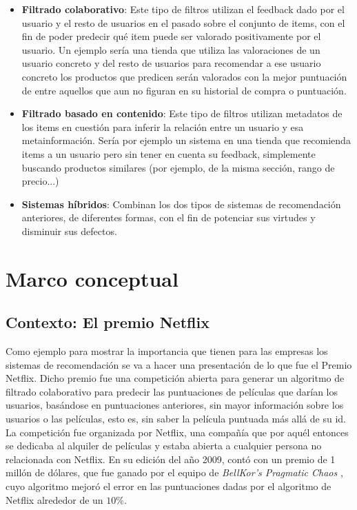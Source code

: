 \begin{itemize}
    \item \textbf{Filtrado colaborativo}: Este tipo de filtros utilizan el feedback dado por el usuario y el resto de usuarios en el pasado sobre el conjunto de items, con el fin de poder predecir qué item puede ser valorado positivamente por el usuario. Un ejemplo sería una tienda que utiliza las valoraciones de un usuario concreto y del resto de usuarios para recomendar a ese usuario concreto los productos que predicen serán valorados con la mejor puntuación de entre aquellos que aun no figuran en su historial de compra o puntuación.
    \item \textbf{Filtrado basado en contenido}: Este tipo de filtros utilizan metadatos de los items en cuestión para inferir la relación entre un usuario y esa metainformación. Sería por ejemplo un sistema en una tienda que recomienda items a un usuario pero sin tener en cuenta su feedback, simplemente buscando productos similares (por ejemplo, de la misma sección, rango de precio...)
    \item \textbf{Sistemas híbridos}: Combinan los dos tipos de sistemas de recomendación anteriores, de diferentes formas, con el fin de potenciar sus virtudes y disminuir sus defectos.
\end{itemize}

\section{Marco conceptual}\label{sec:marcoconceptual}

\subsection{Contexto: El premio Netflix}

Como ejemplo para mostrar la importancia que tienen para las empresas los sistemas de recomendación se va a hacer una presentación de lo que fue el Premio Netflix. Dicho premio fue una competición abierta para generar un algoritmo de filtrado colaborativo para predecir las puntuaciones de películas que darían los usuarios, basándose en puntuaciones anteriores, sin mayor información sobre los usuarios o las películas, esto es, sin saber la película puntuada más allá de su id.\\

La competición fue organizada por Netflix, una compañía que por aquél entonces se dedicaba al alquiler de películas y estaba abierta a cualquier persona no relacionada con Netflix. En su edición del año 2009, contó con un premio de 1 millón de dólares, que fue ganado por el equipo de \textit{BellKor's Pragmatic Chaos} \cite{netflix}, cuyo algoritmo mejoró el  error en las puntuaciones dadas por el algoritmo de Netflix alrededor de un $10 \%$.\\

